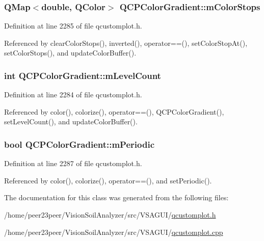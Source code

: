 \subsubsection[{m\+Color\+Stops}]{\setlength{\rightskip}{0pt plus 5cm}Q\+Map$<$double, Q\+Color$>$ Q\+C\+P\+Color\+Gradient\+::m\+Color\+Stops\hspace{0.3cm}{\ttfamily [protected]}}\label{class_q_c_p_color_gradient_a9e11a2b0974ef289d12c324822bc3a3e}


Definition at line 2285 of file qcustomplot.\+h.



Referenced by clear\+Color\+Stops(), inverted(), operator==(), set\+Color\+Stop\+At(), set\+Color\+Stops(), and update\+Color\+Buffer().

\hypertarget{class_q_c_p_color_gradient_a98fb68e359904b2c991fcae3e38a211a}{}
\subsubsection[{m\+Level\+Count}]{\setlength{\rightskip}{0pt plus 5cm}int Q\+C\+P\+Color\+Gradient\+::m\+Level\+Count\hspace{0.3cm}{\ttfamily [protected]}}\label{class_q_c_p_color_gradient_a98fb68e359904b2c991fcae3e38a211a}


Definition at line 2284 of file qcustomplot.\+h.



Referenced by color(), colorize(), operator==(), Q\+C\+P\+Color\+Gradient(), set\+Level\+Count(), and update\+Color\+Buffer().

\hypertarget{class_q_c_p_color_gradient_a4b07deeb20ca1ee2d5ea7e01bf0420af}{}
\subsubsection[{m\+Periodic}]{\setlength{\rightskip}{0pt plus 5cm}bool Q\+C\+P\+Color\+Gradient\+::m\+Periodic\hspace{0.3cm}{\ttfamily [protected]}}\label{class_q_c_p_color_gradient_a4b07deeb20ca1ee2d5ea7e01bf0420af}


Definition at line 2287 of file qcustomplot.\+h.



Referenced by color(), colorize(), operator==(), and set\+Periodic().



The documentation for this class was generated from the following files\+:\begin{DoxyCompactItemize}
\item 
/home/peer23peer/\+Vision\+Soil\+Analyzer/src/\+V\+S\+A\+G\+U\+I/\hyperlink{qcustomplot_8h}{qcustomplot.\+h}\item 
/home/peer23peer/\+Vision\+Soil\+Analyzer/src/\+V\+S\+A\+G\+U\+I/\hyperlink{qcustomplot_8cpp}{qcustomplot.\+cpp}\end{DoxyCompactItemize}
